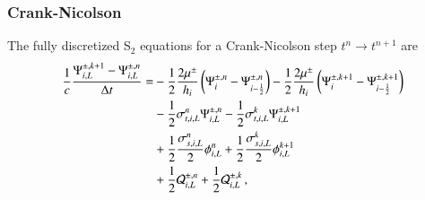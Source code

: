 \subsubsection{Crank-Nicolson}
The fully discretized S$_2$ equations for a Crank-Nicolson step
$t^n\rightarrow t^{n+1}$ are
\begin{equation}\lequ{S2CNfullL}\begin{split}
  \frac{1}{c}\frac{\Psi\iL^{\pm,k+1}-\Psi\iL^{\pm,n}}{\dt} = &
  -\half\frac{2\mu^\pm}{h_i}\fn{\Psi^{\pm,n}_i - \Psi^{\pm,n}_{i-\half}}
  -\half\frac{2\mu^\pm}{h_i}\fn{\Psi^{\pm,k+1}_i - \Psi^{\pm,k+1}_{i-\half}}\\
  &-\half\sigma_{t,i,L}^n\Psi\iL^{\pm,n}
   -\half\sigma_{t,i,L}^k\Psi\iL^{\pm,k+1}\\
  &+\half\frac{\sigma_{s,i,L}^n}{2}\phi\iL^n
   +\half\frac{\sigma_{s,i,L}^k}{2}\phi\iL^{k+1}\\
  &+\half\Q_{i,L}^{\pm,n}
   +\half\Q_{i,L}^{\pm,k} \pec
\end{split}\end{equation}

